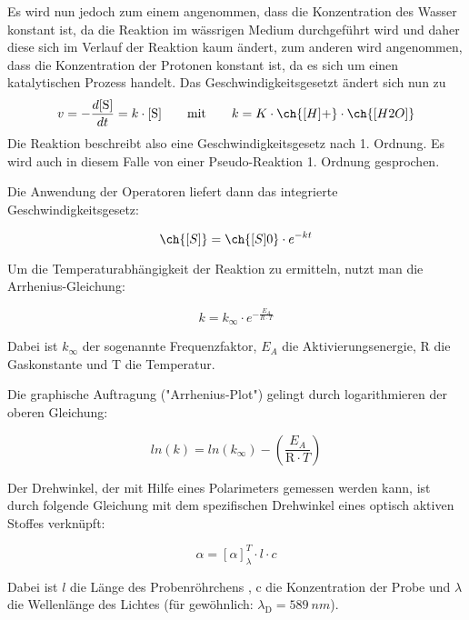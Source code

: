 Es wird nun jedoch zum einem angenommen, dass die Konzentration des Wasser konstant ist, da die Reaktion im wässrigen Medium durchgeführt wird und daher diese sich im Verlauf der Reaktion kaum ändert, zum anderen wird angenommen, dass die Konzentration der Protonen konstant ist, da es sich um einen katalytischen Prozess handelt. Das Geschwindigkeitsgesetzt ändert sich nun zu
\begin{equation}
v = - \frac{d \text{[S]}}{dt}= k \cdot \text{[S]}
\quad\quad \text{mit}\quad\quad  k=K\cdot\ch{\text{[}H\text{]}+} \cdot \ch{[H2O]}
\label{Pseudo1.Ordnung}
\end{equation}
Die Reaktion beschreibt also eine Geschwindigkeitsgesetz nach  1. Ordnung. Es wird auch in diesem Falle von einer Pseudo-Reaktion 1. Ordnung gesprochen. 



Die Anwendung der Operatoren liefert dann das integrierte Geschwindigkeitsgesetz:

\begin{equation}
\ch{[S]} = \ch{[S]0}\cdot e^{-kt}
\label{eq:integriertesGesetz}
\end{equation}

Um die Temperaturabhängigkeit der Reaktion zu ermitteln, nutzt man die Arrhenius-Gleichung:

\begin{equation}
k=k_\infty \cdot e^{ - \frac{E_A}{R \cdot T}}
\label{eq:Arrheniusgleichung}
\end{equation}

Dabei ist $k_\infty$ der sogenannte Frequenzfaktor, $E_A$ die Aktivierungsenergie, R die Gaskonstante und T die Temperatur.

Die graphische Auftragung ("Arrhenius-Plot") gelingt durch logarithmieren der oberen Gleichung:

\begin{equation}
ln(k)=ln(k_\infty)-\left( \frac{E_A}{ \text{R} \cdot T} \right)
\label{eq:logarithmArrhenius}
\end{equation}


Der Drehwinkel, der mit Hilfe eines Polarimeters gemessen werden kann, ist durch folgende Gleichung mit dem spezifischen Drehwinkel eines optisch aktiven Stoffes verknüpft:

\begin{equation}
\alpha=\left[\alpha\right]_\lambda^T \cdot l \cdot c
\label{eq:Drehwinkelallgemein}
\end{equation}

Dabei ist $l$ die Länge des Probenröhrchens , c die Konzentration der Probe und $\lambda$ die Wellenlänge des Lichtes (für gewöhnlich: $\lambda_\text{D}=589~\si{nm}$).


